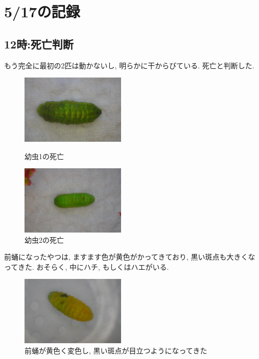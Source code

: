 \documentclass{jsarticle}
\begin{document}
\section{5/17の記録}
\subsection{12時:死亡判断}
もう完全に最初の2匹は動かないし, 明らかに干からびている. 死亡と判断した.
\begin{figure}[htbp]
  \begin{minipage}{0.5\hsize}
    \begin{center}
      \includegraphics[width=5cm]{photo4/Larva1Dead.JPG}
    \end{center}
    \caption{幼虫1の死亡}
    \label{Larba1Dead}
  \end{minipage}
  \begin{minipage}{0.5\hsize}
    \begin{center}
      \includegraphics[width=5cm]{photo4/Larva2Dead.JPG}
    \end{center}
    \caption{幼虫2の死亡}
    \label{Larba2Dead}
  \end{minipage}
\end{figure}
前蛹になったやつは, ますます色が黄色がかってきており, 黒い斑点も大きくなってきた. 
おそらく, 中にハチ, もしくはハエがいる. 
\begin{figure}[htbp]
  \begin{center}
    \includegraphics[width=5cm]{photo4/pupa_parasited.JPG}
  \end{center}
  \caption{前蛹が黄色く変色し, 黒い斑点が目立つようになってきた}
\end{figure}
\end{document}
